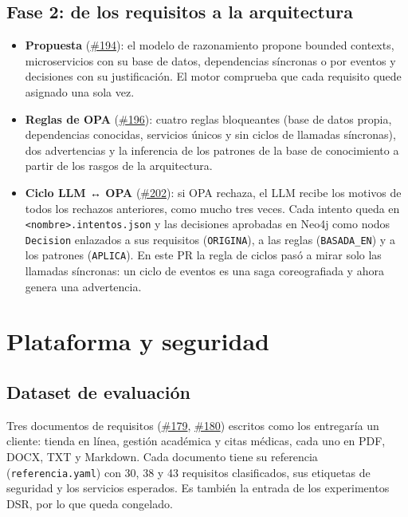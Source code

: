 \documentclass[11pt,a4paper]{report}
\newcommand{\pr}[1]{\href{https://github.com/PracticasESPE/Framework_Desarrollo_Seguro/pull/#1}{\##1}}
\begin{document}
\subsection{Fase 2: de los requisitos a la arquitectura}
\begin{itemize}
\item \textbf{Propuesta} (\pr{194}): el modelo de razonamiento propone bounded contexts,
microservicios con su base de datos, dependencias síncronas o por eventos y decisiones con su
justificación. El motor comprueba que cada requisito quede asignado una sola vez.
\item \textbf{Reglas de OPA} (\pr{196}): cuatro reglas bloqueantes (base de datos propia,
dependencias conocidas, servicios únicos y sin ciclos de llamadas síncronas), dos advertencias y la
inferencia de los patrones de la base de conocimiento a partir de los rasgos de la arquitectura.
\item \textbf{Ciclo LLM ↔ OPA} (\pr{202}): si OPA rechaza, el LLM recibe los motivos de todos los
rechazos anteriores, como mucho tres veces. Cada intento queda en
\texttt{<nombre>.intentos.json} y las decisiones aprobadas en Neo4j como nodos \texttt{Decision}
enlazados a sus requisitos (\texttt{ORIGINA}), a las reglas (\texttt{BASADA\_EN}) y a los patrones
(\texttt{APLICA}). En este PR la regla de ciclos pasó a mirar solo las llamadas síncronas: un ciclo
de eventos es una saga coreografiada y ahora genera una advertencia.
\end{itemize}

\section{Plataforma y seguridad}

\subsection{Dataset de evaluación}
Tres documentos de requisitos (\pr{179}, \pr{180}) escritos como los entregaría un cliente:
tienda en línea, gestión académica y citas médicas, cada uno en PDF, DOCX, TXT y Markdown. Cada
documento tiene su referencia (\texttt{referencia.yaml}) con 30, 38 y 43 requisitos clasificados,
sus etiquetas de seguridad y los servicios esperados. Es también la entrada de los experimentos
DSR, por lo que queda congelado.
\end{document}
